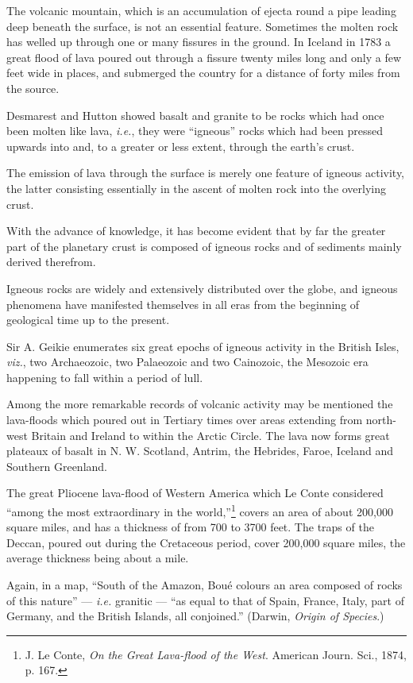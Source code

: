 \documentclass[a4paper, 12pt, oneside]{article}
\begin{document}
The volcanic mountain, which is an accumulation of ejecta round a pipe leading deep beneath the surface, is not an essential feature. Sometimes the molten rock has welled up through one or many fissures in the ground. In Iceland in 1783 a great flood of lava poured out through a fissure twenty miles long and only a few feet wide in places, and submerged the country for a distance of forty miles from the source.

Desmarest and Hutton showed basalt and granite to be rocks which had once been molten like lava, \emph{i.e.}, they were ``igneous'' rocks which had been pressed upwards into and, to a greater or less extent, through the earth's crust.

The emission of lava through the surface is merely one feature of igneous activity, the latter consisting essentially in the ascent of molten rock into the overlying crust.

With the advance of knowledge, it has become evident that by far the greater part of the planetary crust is composed of igneous rocks and of sediments mainly derived therefrom.

Igneous rocks are widely and extensively distributed over the globe, and igneous phenomena have manifested themselves in all eras from the beginning of geological time up to the present.

Sir A. Geikie enumerates six great epochs of igneous activity in the British Isles, \emph{viz.}, two Archaeozoic, two Palaeozoic and two Cainozoic, the Mesozoic era happening to fall within a period of lull.

Among the more remarkable records of volcanic activity may be mentioned the lava-floods which poured out in Tertiary times over areas extending from north-west Britain and Ireland to within the Arctic Circle. The lava now forms great plateaux of basalt in N. W. Scotland, Antrim, the Hebrides, Faroe, Iceland and Southern Greenland.

The great Pliocene lava-flood of Western America which Le Conte considered ``among the most extraordinary in the world,''\footnote{J. Le Conte, \emph{On the Great Lava-flood of the West}. American Journ. Sci., 1874, p. 167.} covers an area of about 200,000 square miles, and has a thickness of from 700 to 3700 feet. The traps of the Deccan, poured out during the Cretaceous period, cover 200,000 square miles, the average thickness being about a mile.

Again, in a map, ``South of the Amazon, Boué colours an area composed of rocks of this nature'' --- \emph{i.e.} granitic --- ``as equal to that of Spain, France, Italy, part of Germany, and the British Islands, all conjoined.'' (Darwin, \emph{Origin of Species}.)
\end{document}
